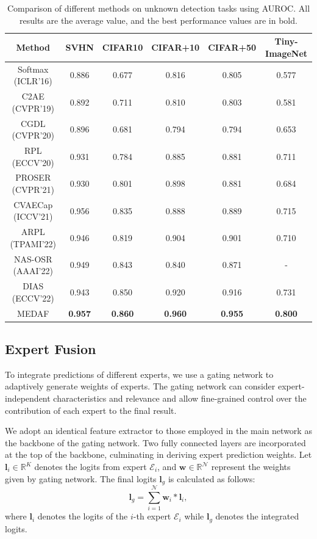 \documentclass[letterpaper]{article} %
\begin{document}
\begin{table}[ht]
\centering
\small
\begin{tabular}{cccccc}
\hline
Method & SVHN & CIFAR10 & CIFAR+10 & CIFAR+50 & Tiny-ImageNet \\ \hline
Softmax (ICLR'16)& 0.886 & 0.677 & 0.816 & 0.805 & 0.577 \\
C2AE (CVPR'19)& 0.892 & 0.711 & 0.810 & 0.803 & 0.581 \\
CGDL (CVPR'20)& 0.896 & 0.681 & 0.794 & 0.794 & 0.653 \\
RPL (ECCV'20)& 0.931 & 0.784 & 0.885 & 0.881 & 0.711 \\
PROSER (CVPR'21)& 0.930 & 0.801 & 0.898 & 0.881 & 0.684 \\
CVAECap (ICCV'21)& 0.956 & 0.835 & 0.888 & 0.889 & 0.715 \\
ARPL (TPAMI'22)& 0.946 & 0.819 & 0.904 & 0.901 & 0.710 \\
NAS-OSR (AAAI'22)& 0.949 & 0.843 & 0.840 & 0.871 & - \\
DIAS (ECCV'22)& 0.943 & 0.850 & 0.920 & 0.916 & 0.731 \\ \hline
MEDAF & \textbf{0.957} & \textbf{0.860} & \textbf{0.960} & \textbf{0.955} & \textbf{0.800} \\ \hline
\end{tabular}
\caption{Comparison of different methods on unknown detection tasks using AUROC. All results are the average value, and the best performance values are in bold.}
\label{table_auroc}
\end{table}

\subsection{Expert Fusion}To integrate predictions of different experts, we use a gating network to adaptively generate weights of experts. The gating network can consider expert-independent characteristics and relevance and allow fine-grained control over the contribution of each expert to the final result.

We adopt an identical feature extractor to those employed in the main network as the backbone of the gating network. Two fully connected layers are incorporated at the top of the backbone, culminating in deriving expert prediction weights. Let $\boldsymbol{l}_i\in\mathbb{R}^{K}$ denotes the logits from expert $\mathcal{E}_i$, and $\boldsymbol{w}\in\mathbb{R}^{\mathcal{N}}$ represent the weights given by gating network. The final logits $\boldsymbol{l}_g$ is calculated as follows:
\begin{equation}
\boldsymbol{l}_g=\sum_{i=1}^{\mathcal{N}}\boldsymbol{w}_i*\boldsymbol{l}_i,
\label{eq:gating_lg}
\end{equation}
where $\boldsymbol{l}_i$ denotes the logits of the $i$-th expert $\mathcal{E}_i$ while $\boldsymbol{l}_g$ denotes the integrated logits.
\end{document}
